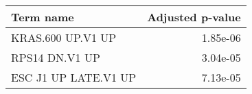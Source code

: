 \begin{tabular}{lr}
\toprule
           Term name &  Adjusted p-value \\
\midrule
   KRAS.600 UP.V1 UP &          1.85e-06 \\
      RPS14 DN.V1 UP &          3.04e-05 \\
ESC J1 UP LATE.V1 UP &          7.13e-05 \\
\bottomrule
\end{tabular}
